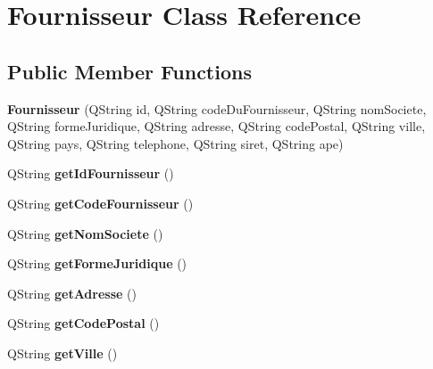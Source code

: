 \hypertarget{class_fournisseur}{}\section{Fournisseur Class Reference}
\label{class_fournisseur}
\subsection*{Public Member Functions}
\begin{DoxyCompactItemize}
\item 
\mbox{\label{class_fournisseur_a301b2476cc5f6f4c5ab220712dba8bf0}} 
{\bfseries Fournisseur} (Q\+String id, Q\+String code\+Du\+Fournisseur, Q\+String nom\+Societe, Q\+String forme\+Juridique, Q\+String adresse, Q\+String code\+Postal, Q\+String ville, Q\+String pays, Q\+String telephone, Q\+String siret, Q\+String ape)
\item 
\mbox{\label{class_fournisseur_ae7ccf2a255b2ce31d88703dc5c28798d}} 
Q\+String {\bfseries get\+Id\+Fournisseur} ()
\item 
\mbox{\label{class_fournisseur_a4ade53722bfbacf27e48f656ac74c6ee}} 
Q\+String {\bfseries get\+Code\+Fournisseur} ()
\item 
\mbox{\label{class_fournisseur_ae83d27670f38c39d2ea4a3979e87c979}} 
Q\+String {\bfseries get\+Nom\+Societe} ()
\item 
\mbox{\label{class_fournisseur_a5676a3819da9e28dbfc67f26f82ac9f5}} 
Q\+String {\bfseries get\+Forme\+Juridique} ()
\item 
\mbox{\label{class_fournisseur_a8f14d2c643575cc8bc7ce836d5bfe9bf}} 
Q\+String {\bfseries get\+Adresse} ()
\item 
\mbox{\label{class_fournisseur_ab8daa4a60b7a40af956e40492ed249b8}} 
Q\+String {\bfseries get\+Code\+Postal} ()
\item 
\mbox{\label{class_fournisseur_ad526bb60f5bb68e79499244c6e174ac3}} 
Q\+String {\bfseries get\+Ville} ()
\item 
\mbox{\label{class_fournisseur_a5004e3d9666618fce013b58ef93b0560}} 

\end{DoxyCompactItemize}

